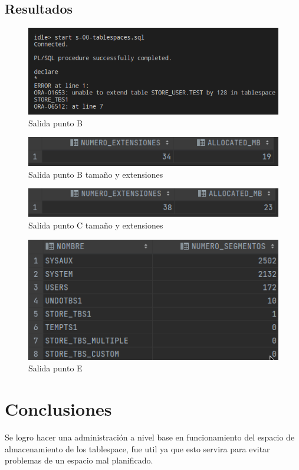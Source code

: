 \documentclass[journal]{IEEEtran}
\begin{document}
\subsection{Resultados}
\begin{figure}[H]
  \centering
  \includegraphics[scale=.30]{captura_1.png}
   \caption{Salida punto B}
   \label{fig:validador_1}
\end{figure}
\begin{figure}[H]
  \centering
  \includegraphics[scale=.30]{captura_2.png}
   \caption{Salida punto B tamaño y extensiones}
   \label{fig:validador_2}
\end{figure}
\begin{figure}[H]
  \centering
  \includegraphics[scale=.30]{captura_4.png}
   \caption{Salida punto C tamaño y extensiones}
   \label{fig:validador_4}
\end{figure}
\begin{figure}[H]
  \centering
  \includegraphics[scale=.30]{captura_3.png}
   \caption{Salida punto E}
   \label{fig:validador_3}
\end{figure}
\section{Conclusiones}
Se logro hacer una administración a nivel base en funcionamiento del espacio de almacenamiento de los tablespace,
fue util ya que esto servira para evitar problemas de un espacio mal planificado.
\ifCLASSOPTIONcaptionsoff
  \newpage

\fi
\end{document}
